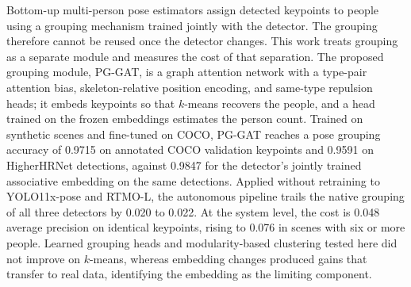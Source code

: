 Bottom-up multi-person pose estimators assign detected keypoints to people using a grouping mechanism trained jointly with the detector.
The grouping therefore cannot be reused once the detector changes.
This work treats grouping as a separate module and measures the cost of that separation.
The proposed grouping module, PG-GAT, is a graph attention network with a type-pair attention bias, skeleton-relative position encoding, and same-type repulsion heads; it embeds keypoints so that $k$-means recovers the people, and a head trained on the frozen embeddings estimates the person count.
Trained on synthetic scenes and fine-tuned on COCO, PG-GAT reaches a pose grouping accuracy of 0.9715 on annotated COCO validation keypoints and 0.9591 on HigherHRNet detections, against 0.9847 for the detector's jointly trained associative embedding on the same detections.
Applied without retraining to YOLO11x-pose and RTMO-L, the autonomous pipeline trails the native grouping of all three detectors by 0.020 to 0.022.
At the system level, the cost is 0.048 average precision on identical keypoints, rising to 0.076 in scenes with six or more people.
Learned grouping heads and modularity-based clustering tested here did not improve on $k$-means, whereas embedding changes produced gains that transfer to real data, identifying the embedding as the limiting component.
